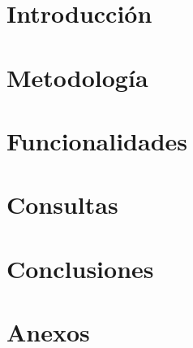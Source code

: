 \documentclass{report}
\begin{document}
    
     

    \tableofcontents

    \chapter{Introducción}
    

    \chapter{Metodología}
    

    \chapter{Funcionalidades}
    

    \chapter{Consultas}
    

    \chapter{Conclusiones}
    

    \chapter{Anexos}
    
\end{document}
